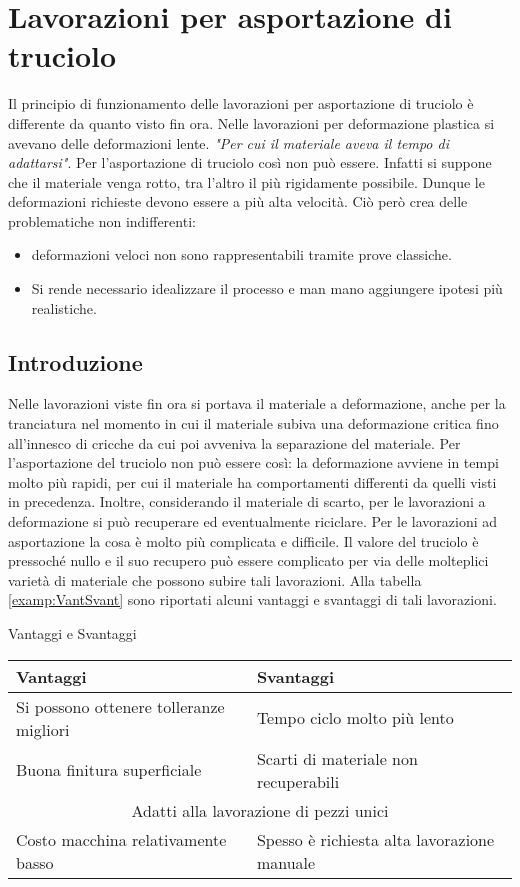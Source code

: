 \chapter{Lavorazioni per asportazione di truciolo}\label{chp:AsportaTruciolo}
Il principio di funzionamento delle lavorazioni per asportazione di truciolo è
differente da quanto visto fin ora.
Nelle lavorazioni per deformazione plastica si avevano delle deformazioni lente.
\emph{"Per cui il materiale aveva il tempo di adattarsi"}.
Per l'asportazione di truciolo così non può essere. Infatti si suppone che il
materiale venga rotto, tra l'altro il più rigidamente possibile.
Dunque le deformazioni richieste devono essere a più alta velocità.
Ciò però crea delle problematiche non indifferenti:
\begin{itemize}
\item deformazioni veloci non sono rappresentabili tramite prove classiche.
\item Si rende necessario idealizzare il processo e man mano aggiungere ipotesi più realistiche.
\end{itemize}

\section{Introduzione}
Nelle lavorazioni viste fin ora si portava il materiale a deformazione, anche per la tranciatura
nel momento in cui il materiale subiva una deformazione critica fino all'innesco di cricche da cui poi
avveniva la separazione del materiale.
Per l'asportazione del truciolo non può essere così: la deformazione avviene in tempi molto più rapidi,
per cui il materiale ha comportamenti differenti da quelli visti in precedenza.
Inoltre, considerando il materiale di scarto, per le lavorazioni a deformazione si può recuperare ed 
eventualmente riciclare.
Per le lavorazioni ad asportazione la cosa è molto più complicata e difficile.
Il valore del truciolo è pressoché nullo e il suo recupero può essere complicato 
per via delle molteplici varietà di materiale che possono subire tali lavorazioni.
Alla tabella \ref{examp:VantSvant} sono riportati alcuni vantaggi e svantaggi di tali lavorazioni.

\begin{example}{Vantaggi e Svantaggi}
\centering
\begin{tabularx}{\textwidth}{XX}
\toprule
\textbf{Vantaggi} & \textbf{Svantaggi}\\
\midrule
Si possono ottenere tolleranze migliori & Tempo ciclo molto più lento\\
\midrule
Buona finitura superficiale & Scarti di materiale non recuperabili\\
\midrule
\multicolumn{2}{c}{Adatti alla lavorazione di pezzi unici}\\
\midrule
Costo macchina relativamente basso & Spesso è richiesta alta lavorazione manuale\\
\bottomrule
\end{tabularx}
\label{examp:VantSvant}
\end{example}


